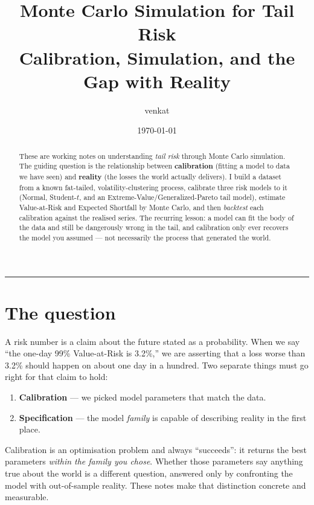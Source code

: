 \documentclass[11pt]{article}
\title{\textbf{Monte Carlo Simulation for Tail Risk}\\[2pt]
\large Calibration, Simulation, and the Gap with Reality}
\author{venkat}
\date{\today}
\begin{document}
\maketitle

\begin{abstract}
\noindent These are working notes on understanding \emph{tail risk} through
Monte Carlo simulation. The guiding question is the relationship between
\textbf{calibration} (fitting a model to data we have seen) and
\textbf{reality} (the losses the world actually delivers). I build a dataset
from a known fat-tailed, volatility-clustering process, calibrate three risk
models to it (Normal, Student-$t$, and an Extreme-Value/Generalized-Pareto
tail model), estimate Value-at-Risk and Expected Shortfall by Monte Carlo,
and then \emph{backtest} each calibration against the realised series. The
recurring lesson: a model can fit the body of the data and still be dangerously
wrong in the tail, and calibration only ever recovers the model you assumed ---
not necessarily the process that generated the world.
\end{abstract}

\tableofcontents
\medskip
\hrule

\section{The question}
A risk number is a claim about the future stated as a probability. When we say
``the one-day 99\% Value-at-Risk is 3.2\%,'' we are asserting that a loss worse
than 3.2\% should happen on about one day in a hundred. Two separate things must
go right for that claim to hold:
\begin{enumerate}[nosep]
  \item \textbf{Calibration} --- we picked model parameters that match the data.
  \item \textbf{Specification} --- the model \emph{family} is capable of
        describing reality in the first place.
\end{enumerate}
Calibration is an optimisation problem and always ``succeeds'': it returns the
best parameters \emph{within the family you chose}. Whether those parameters
say anything true about the world is a different question, answered only by
confronting the model with out-of-sample reality. These notes make that
distinction concrete and measurable.

\end{document}
